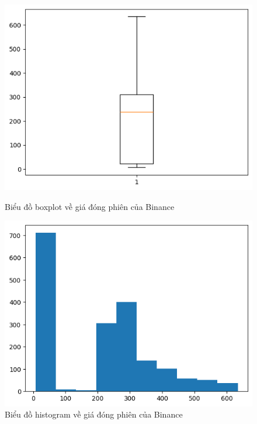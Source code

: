 \documentclass[conference]{IEEEtran}
\begin{document}
\begin{figure}[H]
    \centering
    \begin{minipage}{0.23\textwidth}
    \centering
    \includegraphics[width=1\textwidth]{bibliography/pictures/BNBboxplot.png}
    \caption{Biểu đồ boxplot về giá đóng phiên của Binance}
    \label{fig:1}
    \end{minipage}
    \hfill
    \begin{minipage}{0.23\textwidth}
    \centering
    \includegraphics[width=1\textwidth]{bibliography/pictures/BNBhistogram.png}
    \caption{Biểu đồ histogram về giá đóng phiên của Binance}
    \label{fig:2}
    \end{minipage}
\end{figure}
\end{document}
